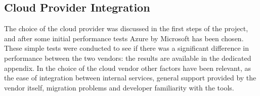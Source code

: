 \subsection{Cloud Provider Integration}
  The choice of the cloud provider was discussed in the first steps of the project, and after some initial performance tests Azure by Microsoft has been chosen. These simple tests were conducted to see if there was a significant difference in performance between the two vendors: the results are available in the dedicated appendix. In the choice of the cloud vendor other factors have been relevant, as the ease of integration between internal services, general support provided by the vendor itself, migration problems and developer familiarity with the tools.

